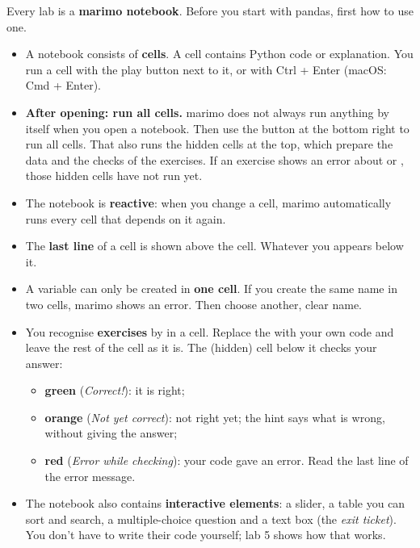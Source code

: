 \documentclass[11pt,a4paper]{article}
\begin{document}
Every lab is a \textbf{marimo notebook}. Before you start with pandas,
first how to use one.

\begin{itemize}
  \item A notebook consists of \textbf{cells}. A cell contains Python code
        or explanation. You run a cell with the play button next to it, or
        with Ctrl + Enter (macOS: Cmd + Enter).
  \item \textbf{After opening: run all cells.} marimo does not always run
        anything by itself when you open a notebook. Then use the button
        at the bottom right to run all cells. That also runs the hidden
        cells at the top, which prepare the data and the checks of the
        exercises. If an exercise shows an error about  or
        , those hidden cells have not run yet.
  \item The notebook is \textbf{reactive}: when you change a cell, marimo
        automatically runs every cell that depends on it again.
  \item The \textbf{last line} of a cell is shown above the cell. Whatever
        you  appears below it.
  \item A variable can only be created in \textbf{one cell}. If you create
        the same name in two cells, marimo shows an error. Then choose
        another, clear name.
  \item You recognise \textbf{exercises} by  in a cell. Replace
        the  with your own code and leave the rest of the cell as
        it is. The (hidden) cell below it checks your answer:
        \begin{itemize}
          \item \textbf{green} (\emph{Correct!}): it is right;
          \item \textbf{orange} (\emph{Not yet correct}): not right yet; the
                hint says what is wrong, without giving the answer;
          \item \textbf{red} (\emph{Error while checking}): your code gave an
                error. Read the last line of the error message.
        \end{itemize}
  \item The notebook also contains \textbf{interactive elements}: a slider,
        a table you can sort and search, a multiple-choice question and a
        text box (the \emph{exit ticket}). You don't have to write their
        code yourself; lab 5 shows how that works.
\end{itemize}
\end{document}
